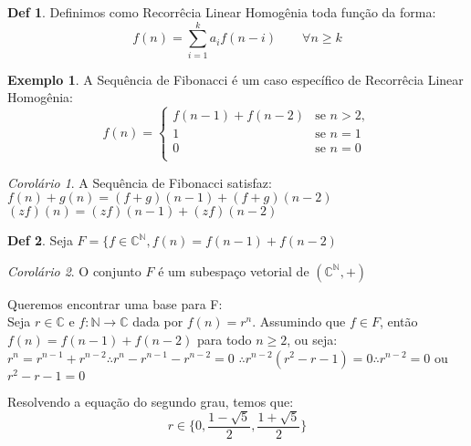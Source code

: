 \documentclass[a4paper,11pt]{article}
\theoremstyle{definition} \newtheorem{definicao}{Def}
\theoremstyle{definition} \newtheorem{exemplo}{Exemplo}
\theoremstyle{plain}      \newtheorem{teorema}{Teorema}
\theoremstyle{remark}     \newtheorem*{corolario}{Corol\'{a}rio}
\begin{document}
\begin{definicao}
Definimos como Recorr\^{e}cia Linear Homog\^{e}nia toda fun\c{c}\~{a}o
da forma:
\begin{equation*}
f(n) = \sum_{i=1}^{k} a_if(n-i) \qquad \forall n \geq k
\end{equation*}
\end{definicao}

\begin{exemplo}
A Sequ\^{e}ncia de Fibonacci \'{e} um caso espec\'{i}fico de
Recorr\^{e}cia Linear Homog\^{e}nia:
\begin{equation*}
f(n) =
\begin{cases}
f(n-1) + f(n-2) & \text{se } n > 2, \\
1 & \text{se } n = 1 \\
0 & \text{se } n = 0 \\
\end{cases}
\end{equation*}
\end{exemplo}

\begin{corolario}
A Sequ\^{e}ncia de Fibonacci satisfaz: \\
$f(n) + g(n) = (f+g)(n-1)+(f+g)(n-2)$ \\
$(zf)(n) = (zf)(n-1) + (zf)(n-2)$
\end{corolario}

\begin{definicao}
Seja $F = \{f \in \mathbb{C}^\mathbb{N}, f(n) = f(n-1) + f(n-2)$
\end{definicao}

\begin{corolario}
O conjunto $F$ \'{e} um subespa\c{c}o vetorial de
$(\mathbb{C}^\mathbb{N},+)$
\end{corolario}

Queremos encontrar uma base para F: \\
Seja $r \in \mathbb{C}$ e $f: \mathbb{N} \longrightarrow \mathbb{C}$
dada por $f(n) = r^n$. Assumindo que $f \in F$, ent\~{a}o
$f(n)=f(n-1)+f(n-2)$ para todo $n \geq 2$, ou seja:
$r^n = r^{n-1} + r^{n-2} \therefore r^n - r^{n-1} - r^{n-2} = 0$
$\therefore r^{n-2}(r^2 -r -1) = 0 \therefore r^{n-2} = 0$ ou
$r^2 -r -1 = 0$

Resolvendo a equa\c{c}\~{a}o do segundo grau, temos que:
\begin{equation*}
r \in \Big\{0, \frac{1 - \sqrt{5}}{2}, \frac{1 + \sqrt{5}}{2}\Big\}
\end{equation*}
\end{document}
